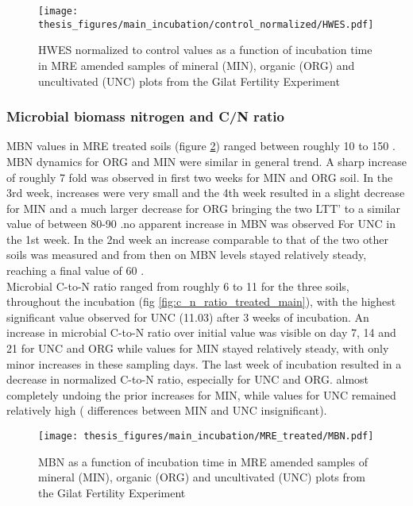 \documentclass[12pt]{report}
\begin{document}
		\begin{figure}[H]
			\centering
			\texttt{[image: thesis\_figures/main\_incubation/control\_normalized/HWES.pdf]}
			\caption{HWES normalized to control values as a function of incubation time in MRE amended samples of mineral (MIN), organic (ORG) and uncultivated (UNC) plots from the Gilat Fertility Experiment}
			\label{fig:hwes_control_normalized_treated_main}
		\end{figure}
		
		\subsubsection{Microbial biomass nitrogen and C/N ratio}
		MBN values in MRE treated soils (figure \ref{fig:mbn_treated_main}) ranged between roughly 10 to 150 \genericunit. MBN dynamics for ORG and MIN were similar in general trend. A sharp increase of roughly  7 fold was observed in first two weeks for MIN and ORG soil. In the 3rd week, increases were very small and the 4th week resulted in a slight decrease for MIN and a much larger decrease for ORG bringing the two LTT’ to a similar value of between 80-90 \genericunit.no apparent increase in MBN was observed For UNC in the 1st week. In the 2nd week an increase comparable to that of the two other soils was measured and from then on MBN levels stayed relatively steady, reaching a final value of 60 \genericunit.\\
		Microbial C-to-N ratio ranged from roughly 6 to 11 for the three soils,  throughout the incubation (fig \ref{fig:c_n_ratio_treated_main}), with the highest significant value observed for UNC (11.03) after 3 weeks of incubation.
		An increase in microbial C-to-N ratio over initial value was visible on day 7, 14 and 21 for UNC and ORG while values for MIN stayed relatively steady, with only minor increases in these sampling days. The last week of incubation resulted in a decrease in normalized C-to-N ratio,  especially for UNC and ORG. almost completely undoing the prior increases for MIN, while values for UNC remained relatively high ( differences between MIN and UNC insignificant).
		
		\begin{figure}[H]
			\centering
			\texttt{[image: thesis\_figures/main\_incubation/MRE\_treated/MBN.pdf]}
			\caption{MBN  as a function of incubation time in MRE amended samples of mineral (MIN), organic (ORG) and uncultivated (UNC) plots from the Gilat Fertility Experiment}
			\label{fig:mbn_treated_main}
		\end{figure}
		
\end{document}
